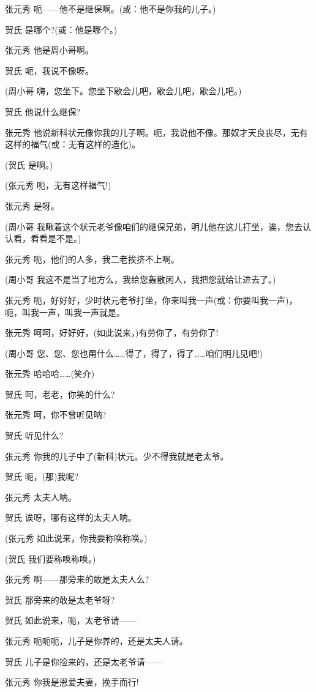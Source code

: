 张元秀 呃------他不是继保啊。(或：他不是你我的儿子。)

贺氏 是哪个?(或：他是哪个。)

张元秀 他是周小哥啊。

贺氏 呃，我说不像呀。

(周小哥 嗨，您坐下。您坐下歇会儿吧，歇会儿吧，歇会儿吧。)

贺氏 他说什么继保?

张元秀
他说新科状元像你我的儿子啊。呃，我说他不像。那奴才天良丧尽，无有这样的福气(或：无有这样的造化)。

(贺氏 是啊。)

(张元秀 呃，无有这样福气!)

张元秀 是呀。

(周小哥
我瞅着这个状元老爷像咱们的继保兄弟，明儿他在这儿打坐，诶，您去认认看，看看是不是。)

张元秀 呃，他们的人多，我二老挨挤不上啊。

(周小哥 我这不是当了地方么，我给您轰散闲人，我把您就给让进去了。)

张元秀
呃，好好好，少时状元老爷打坐，你来叫我一声(或：你要叫我一声)，呃，叫我一声，叫我一声就是。

张元秀 呵呵，好好好，(如此说来，)有劳你了，有劳你了!

(周小哥
您、您、您也甭什么\ldots{}\ldots{}得了，得了，得了\ldots{}\ldots{}咱们明儿见吧!)

张元秀 哈哈哈\ldots{}\ldots{}(笑介)

贺氏 呵，老老，你笑的什么?

张元秀 呵，你不曾听见呐?

贺氏 听见什么?

张元秀 你我的儿子中了(新科)状元。少不得我就是老太爷。

贺氏 呃，(那)我呢?

张元秀 太夫人呐。

贺氏 诶呀，哪有这样的太夫人呐。

(张元秀 如此说来，你我要称唤称唤。)

(贺氏 我们要称唤称唤。)

张元秀 啊------那旁来的敢是太夫人么?

贺氏 那旁来的敢是太老爷呀?

贺氏 如此说来，呃，太老爷请------

张元秀 呃呃呃，儿子是你养的，还是太夫人请。

贺氏 儿子是你捡来的，还是太老爷请------

张元秀 你我是恩爱夫妻，挽手而行!

